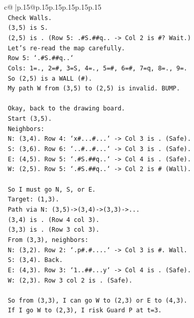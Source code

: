 \documentclass{article}
\begin{document}
{\begin{supertabular}{c@{$\;$}|p{.15\linewidth}@{}p{.15\linewidth}p{.15\linewidth}p{.15\linewidth}p{.15\linewidth}p{.15\linewidth}}
{{{\\ 
\texttt{   Check Walls.} \\
\texttt{   (3,5) is S.} \\
\texttt{   (2,5) is . (Row 5: .\#S.\#\#q.. {-}> Col 2 is \#? Wait.)} \\
\texttt{   Let's re{-}read the map carefully.} \\
\texttt{   Row 5: `.\#S.\#\#q..`} \\
\texttt{   Cols: 1=., 2=\#, 3=S, 4=., 5=\#, 6=\#, 7=q, 8=., 9=.} \\
\texttt{   So (2,5) is a WALL (\#).} \\
\texttt{   My path W from (3,5) to (2,5) is invalid. BUMP.} \\
\\ 
\texttt{   Okay, back to the drawing board.} \\
\texttt{   Start (3,5).} \\
\texttt{   Neighbors:} \\
\texttt{   N: (3,4). Row 4: `x\#...\#...` {-}> Col 3 is . (Safe).} \\
\texttt{   S: (3,6). Row 6: `..\#..\#...` {-}> Col 3 is . (Safe).} \\
\texttt{   E: (4,5). Row 5: `.\#S.\#\#q..` {-}> Col 4 is . (Safe).} \\
\texttt{   W: (2,5). Row 5: `.\#S.\#\#q..` {-}> Col 2 is \# (Wall).} \\
\\ 
\texttt{   So I must go N, S, or E.} \\
\texttt{   Target: (1,3).} \\
\texttt{   Path via N: (3,5){-}>(3,4){-}>(3,3){-}>...} \\
\texttt{   (3,4) is . (Row 4 col 3).} \\
\texttt{   (3,3) is . (Row 3 col 3).} \\
\texttt{   From (3,3), neighbors:} \\
\texttt{   N: (3,2). Row 2: `.p\#.\#....` {-}> Col 3 is \#. Wall.} \\
\texttt{   S: (3,4). Back.} \\
\texttt{   E: (4,3). Row 3: `1..\#\#...y` {-}> Col 4 is . (Safe).} \\
\texttt{   W: (2,3). Row 3 col 2 is . (Safe).} \\
\\ 
\texttt{   So from (3,3), I can go W to (2,3) or E to (4,3).} \\
\texttt{   If I go W to (2,3), I risk Guard P at t=3.} \\
}}}
\end{supertabular}}
\end{document}
